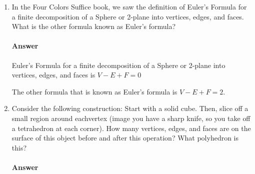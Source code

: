 \documentclass{article}
\begin{document}
\begin{enumerate}

    \item In the Four Colors Suffice book, we saw the definition of Euler's
        Formula for a finite decomposition of a Sphere or 2-plane into vertices,
        edges, and faces.  What is the other formula known as Euler's formula?

        \paragraph{Answer}

        Euler's Formula for a finite decomposition of a Sphere or 2-plane into
        vertices, edges, and faces is $V-E+F=0$

        The other formula that is known as Euler's formula is $V-E+F=2$.


    \item  Consider the following construction: Start with a solid cube.  Then, slice
        off a small region around eachvertex (image you have a sharp knife, so you take
        off a tetrahedron at each corner).  How many vertices, edges, and faces are on
        the surface of this object before and after this operation? What polyhedron is this?

        \paragraph{Answer}


\end{enumerate}
\end{document}
